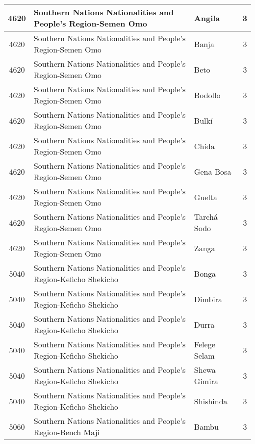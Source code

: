 \documentclass[12pt,a4paper]{report}
\begin{document}
\begin{tabular}{|c|l|l|c|}
\hline 
\rule[-1ex]{0pt}{2.5ex} 4620 & Southern Nations Nationalities and People's Region-Semen Omo & Angila & 3 \\
\hline 
\rule[-1ex]{0pt}{2.5ex} 4620 & Southern Nations Nationalities and People's Region-Semen Omo & Banja & 3 \\
\hline 
\rule[-1ex]{0pt}{2.5ex} 4620 & Southern Nations Nationalities and People's Region-Semen Omo & Beto & 3 \\
\hline 
\rule[-1ex]{0pt}{2.5ex} 4620 & Southern Nations Nationalities and People's Region-Semen Omo & Bodollo & 3 \\
\hline 
\rule[-1ex]{0pt}{2.5ex} 4620 & Southern Nations Nationalities and People's Region-Semen Omo & Bulk\'i & 3 \\
\hline 
\rule[-1ex]{0pt}{2.5ex} 4620 & Southern Nations Nationalities and People's Region-Semen Omo & Ch\'ida & 3 \\
\hline 
\rule[-1ex]{0pt}{2.5ex} 4620 & Southern Nations Nationalities and People's Region-Semen Omo & Gena Bosa & 3 \\
\hline 
\rule[-1ex]{0pt}{2.5ex} 4620 & Southern Nations Nationalities and People's Region-Semen Omo & Guelta & 3 \\
\hline 
\rule[-1ex]{0pt}{2.5ex} 4620 & Southern Nations Nationalities and People's Region-Semen Omo & Tarch\'a Sodo & 3 \\
\hline 
\rule[-1ex]{0pt}{2.5ex} 4620 & Southern Nations Nationalities and People's Region-Semen Omo & Zanga & 3 \\
\hline 
\rule[-1ex]{0pt}{2.5ex} 5040 & Southern Nations Nationalities and People's Region-Keficho Shekicho & Bonga & 3 \\
\hline 
\rule[-1ex]{0pt}{2.5ex} 5040 & Southern Nations Nationalities and People's Region-Keficho Shekicho & Dimbira & 3 \\
\hline 
\rule[-1ex]{0pt}{2.5ex} 5040 & Southern Nations Nationalities and People's Region-Keficho Shekicho & Durra & 3 \\
\hline 
\rule[-1ex]{0pt}{2.5ex} 5040 & Southern Nations Nationalities and People's Region-Keficho Shekicho & Felege Selam & 3 \\
\hline 
\rule[-1ex]{0pt}{2.5ex} 5040 & Southern Nations Nationalities and People's Region-Keficho Shekicho & Shewa Gimira & 3 \\
\hline 
\rule[-1ex]{0pt}{2.5ex} 5040 & Southern Nations Nationalities and People's Region-Keficho Shekicho & Shishinda & 3 \\
\hline 
\rule[-1ex]{0pt}{2.5ex} 5060 & Southern Nations Nationalities and People's Region-Bench Maji & Bambu & 3 \\

\end{tabular}
\end{document}
